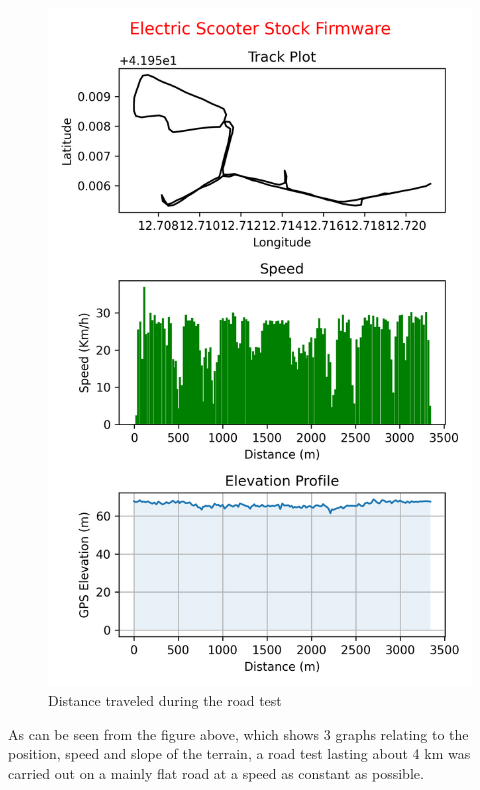 \documentclass[binding=0.6cm,LaM,noexaminfo]{sapthesis}
\begin{document}
\begin{figure}[!htp]
\begin{minipage}[t]{.45\textwidth}
    \centering\includegraphics[width=.87\textwidth]{images/graphs/gpx2.png}
    \end{minipage}
    \caption{Distance traveled during the road test}
    \label{fig:distance_traveled}
\end{figure}

\newpage
\noindent As can be seen from the figure above, which shows 3 graphs relating to the position, speed and slope of the terrain, a road test lasting about 4 km was carried out on a mainly flat road at a speed as constant as possible.\\
\end{document}
